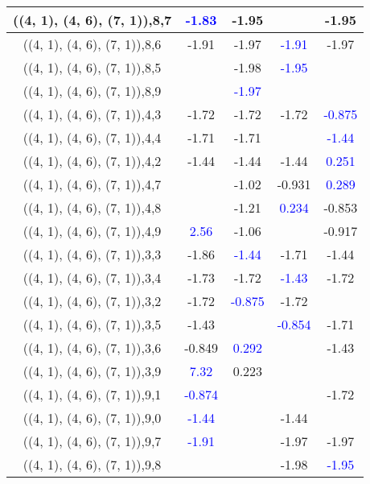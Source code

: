 \documentclass{article}
\begin{document}
\begin{center}
\begin{longtable}{|c|c|c|c|c|}
        	\hline
        	((4, 1), (4, 6), (7, 1)),8,7& \textcolor{blue}{-1.83}&-1.95&&-1.95\\
        	\hline
        	((4, 1), (4, 6), (7, 1)),8,6&-1.91&-1.97& \textcolor{blue}{-1.91}&-1.97\\
        	\hline
        	((4, 1), (4, 6), (7, 1)),8,5&&-1.98& \textcolor{blue}{-1.95}&\\
        	\hline
        	((4, 1), (4, 6), (7, 1)),8,9&& \textcolor{blue}{-1.97}&&\\
        	\hline
        	((4, 1), (4, 6), (7, 1)),4,3&-1.72&-1.72&-1.72& \textcolor{blue}{-0.875}\\
        	\hline
        	((4, 1), (4, 6), (7, 1)),4,4&-1.71&-1.71&& \textcolor{blue}{-1.44}\\
        	\hline
        	((4, 1), (4, 6), (7, 1)),4,2&-1.44&-1.44&-1.44& \textcolor{blue}{0.251}\\
        	\hline
        	((4, 1), (4, 6), (7, 1)),4,7&&-1.02&-0.931& \textcolor{blue}{0.289}\\
        	\hline
        	((4, 1), (4, 6), (7, 1)),4,8&&-1.21& \textcolor{blue}{0.234}&-0.853\\
        	\hline
        	((4, 1), (4, 6), (7, 1)),4,9& \textcolor{blue}{2.56}&-1.06&&-0.917\\
        	\hline
        	((4, 1), (4, 6), (7, 1)),3,3&-1.86& \textcolor{blue}{-1.44}&-1.71&-1.44\\
        	\hline
        	((4, 1), (4, 6), (7, 1)),3,4&-1.73&-1.72& \textcolor{blue}{-1.43}&-1.72\\
        	\hline
        	((4, 1), (4, 6), (7, 1)),3,2&-1.72& \textcolor{blue}{-0.875}&-1.72&\\
        	\hline
        	((4, 1), (4, 6), (7, 1)),3,5&-1.43&& \textcolor{blue}{-0.854}&-1.71\\
        	\hline
        	((4, 1), (4, 6), (7, 1)),3,6&-0.849& \textcolor{blue}{0.292}&&-1.43\\
        	\hline
        	((4, 1), (4, 6), (7, 1)),3,9& \textcolor{blue}{7.32}&0.223&&\\
        	\hline
        	((4, 1), (4, 6), (7, 1)),9,1& \textcolor{blue}{-0.874}&&&-1.72\\
        	\hline
        	((4, 1), (4, 6), (7, 1)),9,0& \textcolor{blue}{-1.44}&&-1.44&\\
        	\hline
        	((4, 1), (4, 6), (7, 1)),9,7& \textcolor{blue}{-1.91}&&-1.97&-1.97\\
        	\hline
        	((4, 1), (4, 6), (7, 1)),9,8&&&-1.98& \textcolor{blue}{-1.95}\\

\end{longtable}
\end{center}
\end{document}
